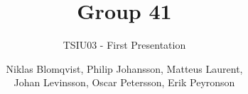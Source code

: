 \documentclass{beamer}
\title{Group 41}
\subtitle{TSIU03 - First Presentation}
\author{Niklas Blomqvist, Philip Johansson, Matteus Laurent,\\ Johan Levinsson, Oscar Petersson, Erik Peyronson}
\begin{document}
\frame{\titlepage}

\end{document}
